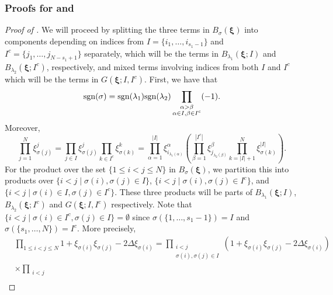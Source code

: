 \documentclass[a4paper,11pt]{article}
\theoremstyle{definition}
\begin{document}
\subsubsection{Proofs for \texorpdfstring{}{Lemma 6.4} and \texorpdfstring{}{Lemma 6.6}}
\label{s:L6.2 and 6.5 proofs}
\begin{proof}[Proof of ]
    We will proceed by splitting the three terms in $B_\sigma(\boldsymbol{\xi})$ into components depending on indices from $I=\{i_1,\ldots,i_{s_1-1}\}$ and $I^c=\{j_1,\ldots,j_{N-s_1+1}\}$ separately, which will be the terms in $B_{\lambda_1}(\boldsymbol{\xi};I)$ and $B_{\lambda_2}(\boldsymbol{\xi};I^c)$, respectively, and mixed terms involving indices from both $I$ and $I^c$ which will be the terms in $G(\boldsymbol{\xi};I,I^c)$. First, we have that \begin{equation}
        \mathrm{sgn}(\sigma)=\mathrm{sgn}(\lambda_1)\mathrm{sgn}(\lambda_2)\prod_{\substack{\alpha>\beta\\\alpha\in I ,\space \beta\in I^c}}(-1).
    \end{equation}
    Moreover, 
    \begin{equation}
        \prod_{j=1}^N\xi_{\sigma(j)}^j = \prod_{j\in I}\xi_{\sigma(j)}^j\prod_{k\in I^c}\xi_{\sigma(k)}^k = \prod_{\alpha=1}^{|I|}\xi_{i_{\lambda_1(\alpha)}}^\alpha\left(\prod_{\beta=1}^{|I^c|}\xi_{j_{\lambda_2(\beta)}}^\beta \prod_{k=|I|+1}^N\xi_{\sigma(k)}^{|I|}\right).
    \end{equation}
    For the product over the set $\{1\leq i < j \leq N\}$ in $B_\sigma(\boldsymbol{\xi})$, we partition this into products over $\{i<j\mid \sigma(i),\sigma(j)\in I\}$, $\{i<j\mid \sigma(i),\sigma(j)\in I^c\}$, and $\{i<j \mid \sigma(i)\in I, \sigma(j)\in I^c\}$. These three products will be parts of $B_{\lambda_1}(\boldsymbol{\xi};I)$, $B_{\lambda_2}(\boldsymbol{\xi};I^c)$ and $G(\boldsymbol{\xi};I,I^c)$ respectively. Note that $\{i<j\mid \sigma(i)\in I^c,\sigma(j)\in I\}=\emptyset$ since $\sigma\left(\{1,\ldots,s_1-1\}\right)=I$ and $\sigma\left(\{s_1,\ldots,N\}\right)=I^c$. More precisely, 
    \begin{equation}
        \begin{split}
            &\prod_{1\leq i < j \leq N}1+\xi_{\sigma(i)}\xi_{\sigma(j)}-2\Delta\xi_{\sigma(i)} = \prod_{\substack{i<j\\\sigma(i),\sigma(j)\in I}}\left(1+\xi_{\sigma(i)}\xi_{\sigma(j)}-2\Delta\xi_{\sigma(i)}\right)\\ &\times\prod_{\substack{i<j\\
}}
\end{split}
\end{equation}
\end{proof}
\end{document}
